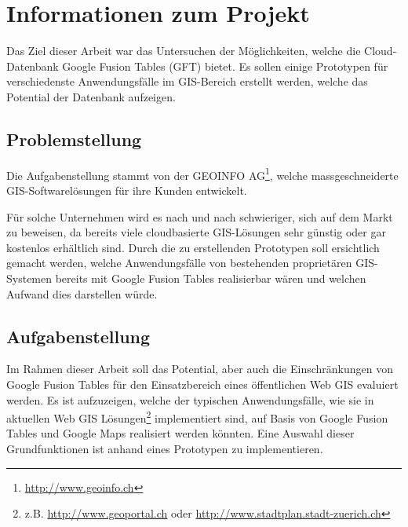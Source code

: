 \chapter{Informationen zum Projekt}
\label{informationen-projekt}
Das Ziel dieser Arbeit war das Untersuchen der Möglichkeiten, welche die \gls{Cloud}-Datenbank Google Fusion Tables (GFT) bietet. Es sollen einige Prototypen für verschiedenste Anwendungsfälle im \gls{GIS}-Bereich erstellt werden, welche das Potential der Datenbank aufzeigen.

\section{Problemstellung}
Die Aufgabenstellung stammt von der GEOINFO AG\footnote{\url{http://www.geoinfo.ch}}, welche massgeschneiderte \gls{GIS}-Softwarelösungen für ihre Kunden entwickelt.

Für solche Unternehmen wird es nach und nach schwieriger, sich auf dem Markt zu beweisen, da bereits viele cloudbasierte \gls{GIS}-Lösungen sehr günstig oder gar kostenlos erhältlich sind. Durch die zu erstellenden Prototypen soll ersichtlich gemacht werden, welche Anwendungsfälle von bestehenden proprietären \gls{GIS}-Systemen bereits mit Google Fusion Tables realisierbar wären und welchen Aufwand dies darstellen würde.

\section{Aufgabenstellung}
Im Rahmen dieser Arbeit soll das Potential, aber auch die Einschränkungen von Google Fusion Tables für den Einsatzbereich eines öffentlichen Web \gls{GIS} evaluiert werden. Es ist aufzuzeigen, welche der typischen Anwendungsfälle, wie sie in aktuellen Web \gls{GIS} Lösungen\footnote{z.B. \url{http://www.geoportal.ch} oder \url{http://www.stadtplan.stadt-zuerich.ch}} implementiert sind, auf Basis von Google Fusion Tables und Google Maps realisiert werden könnten. Eine Auswahl dieser Grundfunktionen ist anhand eines Prototypen zu implementieren.

